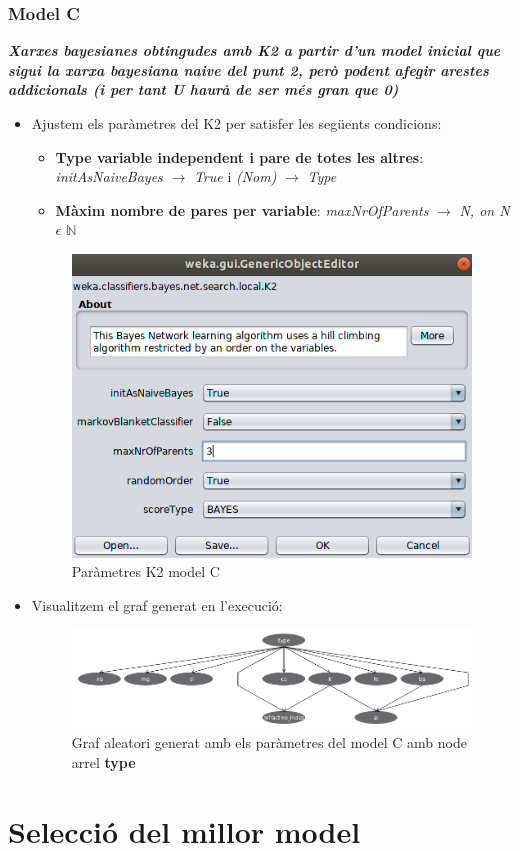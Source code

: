 \documentclass[11pt,a4paper]{article}
\begin{document}
\newpage

\section{Model C}
\textbf{\textit{Xarxes bayesianes obtingudes amb K2 a partir d'un model inicial que sigui la xarxa bayesiana naive del punt 2, però podent afegir arestes addicionals (i per tant U haurà de ser més gran que 0)}}
\begin{itemize}
\item Ajustem els paràmetres del K2 per satisfer les següents condicions:
	\begin{itemize}
	\item \textbf{Type variable independent i pare de totes les altres}: \textit{initAsNaiveBayes} $\rightarrow$ \textit{True} i \textit{(Nom)} $\rightarrow$ \textit{Type}
	\item \textbf{Màxim nombre de pares per variable}:  
 \textit{maxNrOfParents} $\rightarrow$ \textit{N, on N $\epsilon$  $\mathbb{N}$ }\\
	\end{itemize}
	\begin{figure}[hbtp]
	\centering
	\includegraphics[scale=0.4]{Figures/4.png}
	\caption{Paràmetres K2 model C}
	\end{figure}
\item Visualitzem el graf generat en l'execució:\\
	\begin{figure}[hbtp]
	\centering
	\includegraphics[scale=0.4]{Figures/r3.png}
	\caption{Graf aleatori generat amb els paràmetres del model C amb node arrel \textbf{type}}
	\end{figure}
\end{itemize}
\newpage

\part{Selecció del millor model}
\end{document}
